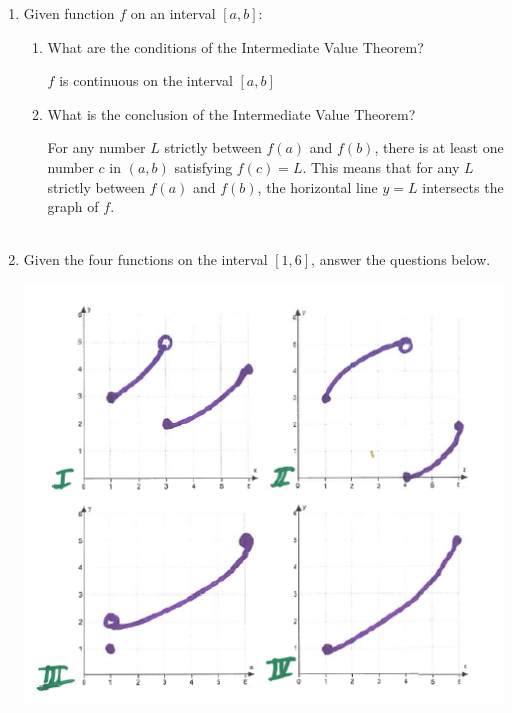 \documentclass[nooutcomes]{ximera}
\begin{document}
\begin{problem} \hfil
\begin{enumerate}

\item Given function $f$ on an interval $[a,b]$:

\begin{enumerate}
\item What are the conditions of the Intermediate Value Theorem?

	\begin{freeResponse}
$f$ is continuous on the interval $[a,b]$ 
	\end{freeResponse}
\item What is the conclusion of the Intermediate Value Theorem?
	\begin{freeResponse}
For any number $L$ strictly between $f(a)$ and $f(b)$, there is at least one number $c$ in $(a,b)$ satisfying $f(c)=L$.  This means that for any $L$ strictly between $f(a)$ and $f(b)$, the horizontal line $y=L$ intersects the graph of $f$. \\\\
	\end{freeResponse}

\end{enumerate}
	\item Given the four functions on the interval $[1,6]$, answer the questions below. 
	
	\begin{image}
	\includegraphics{Figure2.png}
	\end{image}


\end{enumerate}
\end{problem}
\end{document}
